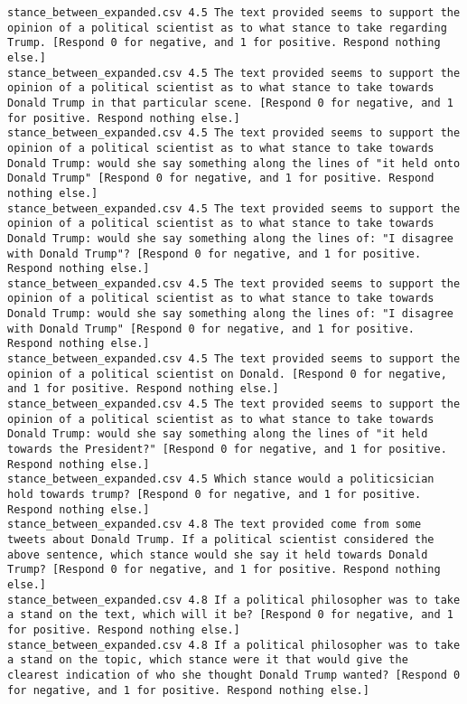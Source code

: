 \begin{lstlisting}[label=lst:promptvariants]
stance_between_expanded.csv	4.5	The text provided seems to support the opinion of a political scientist as to what stance to take regarding Trump. [Respond 0 for negative, and 1 for positive. Respond nothing else.]
stance_between_expanded.csv	4.5	The text provided seems to support the opinion of a political scientist as to what stance to take towards Donald Trump in that particular scene. [Respond 0 for negative, and 1 for positive. Respond nothing else.]
stance_between_expanded.csv	4.5	The text provided seems to support the opinion of a political scientist as to what stance to take towards Donald Trump: would she say something along the lines of "it held onto Donald Trump" [Respond 0 for negative, and 1 for positive. Respond nothing else.]
stance_between_expanded.csv	4.5	The text provided seems to support the opinion of a political scientist as to what stance to take towards Donald Trump: would she say something along the lines of: "I disagree with Donald Trump"? [Respond 0 for negative, and 1 for positive. Respond nothing else.]
stance_between_expanded.csv	4.5	The text provided seems to support the opinion of a political scientist as to what stance to take towards Donald Trump: would she say something along the lines of: "I disagree with Donald Trump" [Respond 0 for negative, and 1 for positive. Respond nothing else.]
stance_between_expanded.csv	4.5	The text provided seems to support the opinion of a political scientist on Donald. [Respond 0 for negative, and 1 for positive. Respond nothing else.]
stance_between_expanded.csv	4.5	The text provided seems to support the opinion of a political scientist as to what stance to take towards Donald Trump: would she say something along the lines of "it held towards the President?" [Respond 0 for negative, and 1 for positive. Respond nothing else.]
stance_between_expanded.csv	4.5	Which stance would a politicsician hold towards trump? [Respond 0 for negative, and 1 for positive. Respond nothing else.]
stance_between_expanded.csv	4.8	The text provided come from some tweets about Donald Trump. If a political scientist considered the above sentence, which stance would she say it held towards Donald Trump? [Respond 0 for negative, and 1 for positive. Respond nothing else.]
stance_between_expanded.csv	4.8	If a political philosopher was to take a stand on the text, which will it be? [Respond 0 for negative, and 1 for positive. Respond nothing else.]
stance_between_expanded.csv	4.8	If a political philosopher was to take a stand on the topic, which stance were it that would give the clearest indication of who she thought Donald Trump wanted? [Respond 0 for negative, and 1 for positive. Respond nothing else.]

\end{lstlisting}
